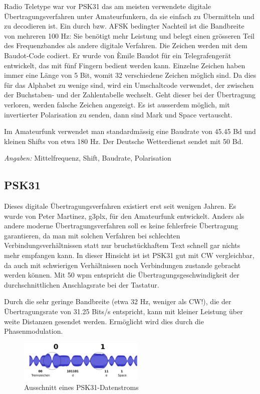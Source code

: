 Radio Teletype war vor PSK31 das am meisten verwendete digitale Übertragungsverfahren unter Amateurfunkern, da sie einfach zu Übermitteln und zu decodieren ist. Ein durch  bzw. AFSK bedingter Nachteil ist die Bandbreite von mehreren 100 Hz: Sie benötigt mehr Leistung und belegt einen grösseren Teil des Frequenzbandes als andere digitale Verfahren. Die Zeichen werden mit dem Baudot-Code codiert. Er wurde von Èmile Baudot für ein Telegrafengerät entwickelt, das mit fünf Fingern bedient werden kann. Einzelne Zeichen haben immer eine Länge von 5 Bit, womit 32 verschiedene Zeichen möglich sind. Da dies für das Alphabet zu wenige sind, wird ein Umschaltcode verwendet, der zwischen der Buchstaben- und der Zahlentabelle wechselt. Geht dieser bei der Übertragung verloren, werden falsche Zeichen angezeigt. Es ist ausserdem möglich, mit invertierter Polarisation zu senden, dann sind Mark und Space vertauscht.

Im Amateurfunk verwendet man standardmässig eine Baudrate von 45.45 Bd und kleinen Shifts von etwa 180 Hz. Der Deutsche Wetterdienst sendet mit 50 Bd.

\textit{Angaben:} Mittelfrequenz, Shift, Baudrate, Polarisation

\subsection{PSK31}
Dieses digitale Übertragungsverfahren existiert erst seit wenigen Jahren. Es wurde von Peter Martinez, g3plx, für den Amateurfunk entwickelt. Anders als andere moderne Übertragungsverfahren soll es keine fehlerfreie Übertragung garantieren, da man mit solchen Verfahren bei schlechten Verbindungsverhältnissen statt nur bruchstückhaftem Text schnell gar nichts mehr empfangen kann. In dieser Hinsicht ist ist PSK31 gut mit CW vergleichbar, da auch mit schwierigen Verhältnissen noch Verbindungen zustande gebracht werden können. Mit 50 wpm entspricht die Übertragungsgeschwindigkeit der durchschnittlichen Anschlagsrate bei der Tastatur.

Durch die sehr geringe Bandbreite (etwa 32 Hz, weniger als CW!), die der Übertragungsrate von 31.25 Bits/s entspricht, kann mit kleiner Leistung über weite Distanzen gesendet werden. Ermöglicht wird dies durch die Phasenmodulation.

\begin{figure}[h!]
 \centering
 \includegraphics[width=6cm]{./png/Amfu-PSK31-0101.png}
 \caption{Ausschnitt eines PSK31-Datenstroms}
 \label{fig:psk31}
\end{figure}


